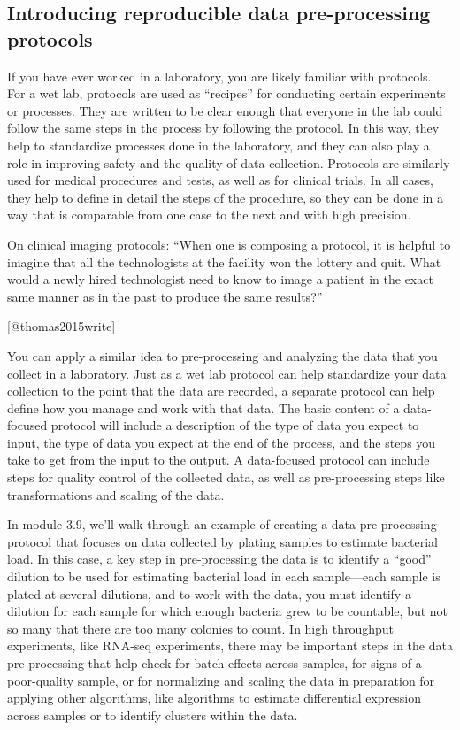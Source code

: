 \documentclass[]{tufte-book}
\begin{document}
\subsection{Introducing reproducible data pre-processing protocols}\label{introducing-reproducible-data-pre-processing-protocols}

If you have ever worked in a laboratory, you are likely familiar with protocols.
For a wet lab, protocols are used as ``recipes'' for conducting certain
experiments or processes. They are written to be clear enough that everyone in
the lab could follow the same steps in the process by following the protocol. In
this way, they help to standardize processes done in the laboratory, and they
can also play a role in improving safety and the quality of data collection.
Protocols are similarly used for medical procedures and
tests, as well as for clinical trials. In all cases, they help to define in
detail the steps of the procedure, so they can be done in a way that is
comparable from one case to the next and with high precision.

\begin{marginfigure}
On clinical imaging protocols: ``When one is composing a protocol, it is
helpful to imagine that all the technologists at the facility won the
lottery and quit. What would a newly hired technologist need to know to
image a patient in the exact same manner as in the past to produce the
same results?''

{[}@thomas2015write{]}
\end{marginfigure}

You can apply a similar idea to pre-processing and analyzing the data that you
collect in a laboratory. Just as a wet lab protocol can help standardize your
data collection to the point that the data are recorded, a separate protocol
can help define how you manage and work with that data.
The basic content of a data-focused protocol will include a description of the type of data
you expect to input, the type of data you expect at the end of the process,
and the steps you take to get from the input to the output.
A data-focused protocol can include steps for quality control of the
collected data, as well as pre-processing steps like transformations and
scaling of the data.

In module 3.9, we'll walk through an example of creating a data pre-processing
protocol that focuses on data collected by plating samples to estimate
bacterial load. In this case, a key step in pre-processing the data is to
identify a ``good'' dilution to be used for estimating bacterial load in each
sample---each sample is plated at several dilutions, and to work with the data,
you must identify a dilution for each sample for which enough bacteria grew to
be countable, but not so many that there are too many colonies to count. In high
throughput experiments, like RNA-seq experiments, there may be important steps
in the data pre-processing that help check for batch effects across samples, for
signs of a poor-quality sample, or for normalizing and scaling the data in
preparation for applying other algorithms, like algorithms to estimate
differential expression across samples or to identify clusters within the data.
\end{document}
